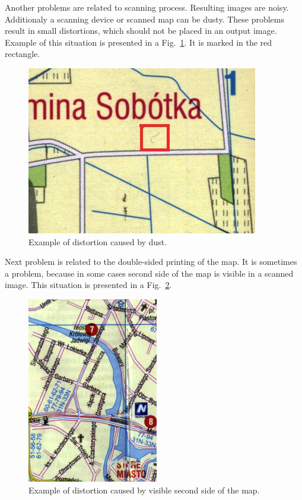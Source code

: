 \documentclass[a4paper,onecolumn,oneside,12pt]{memoir}
\begin{document}
Another problems are related to scanning process. Resulting images are noisy. Additionaly a
scanning device or scanned map can be dusty. These problems result in small distortions, which
should not be placed in an output image. Example of this situation is presented in a 
Fig.~\ref{dustExample}. It is marked in the red rectangle.

\begin{figure}[!ht]
\begin{center}
\includegraphics[scale=3.0]{images/dustExample.jpg}
\caption{Example of distortion caused by dust.}
\label{dustExample}
\end{center}
\end{figure}

Next problem is related to the double-sided printing of the map. It is sometimes a problem, because
in some cases second side of the map is visible in a scanned image. This situation is presented in a
Fig.~\ref{doubleSidedMap}.

\begin{figure}[!ht]
\begin{center}
\includegraphics[scale=0.8]{images/doubleSidedMap.png}
\caption{Example of distortion caused by visible second side of the map.}
\label{doubleSidedMap}
\end{center}
\end{figure}
\end{document}
